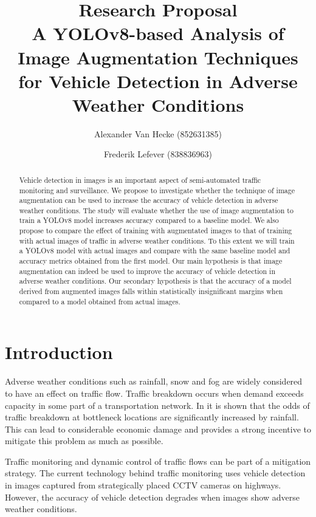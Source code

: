 \documentclass[]{article}
\title{Research Proposal \\
	A YOLOv8-based Analysis of Image Augmentation Techniques for Vehicle Detection in Adverse Weather Conditions}
\author{
		Alexander Van Hecke \small(852631385) \and 
		Frederik Lefever    \small(838836963)}
\begin{document}
\maketitle

\begin{abstract}
	Vehicle detection in images is an important aspect of semi-automated traffic monitoring and surveillance.  We propose to investigate whether the technique of image augmentation can be used to increase the accuracy of vehicle detection in adverse weather conditions.  The study will evaluate whether the use of image augmentation to train a YOLO\small{v8} model increases accuracy compared to a baseline model.  We also propose to compare the effect of training with augmentated images to that of training with actual images of traffic in adverse weather conditions. To this extent we will train a YOLO\small{v8} model with actual images and compare with the same baseline model and accuracy metrics obtained from the first model. Our main hypothesis is that image augmentation can indeed be used to improve the accuracy of vehicle detection in adverse weather conditions. Our secondary hypothesis is that the accuracy of a model derived from augmented images falls within statistically insignificant margins when compared to a model obtained from actual images.  
\end{abstract}

\section{Introduction}

	Adverse weather conditions such as rainfall, snow and fog are widely considered to have an effect on traffic flow. Traffic breakdown occurs when demand exceeds capacity in some part of a transportation network. In \cite{stralenInfluenceAdverseWeather2015} it is shown that the odds of traffic breakdown at bottleneck locations are significantly increased by rainfall.  This can lead to considerable economic damage and provides a strong incentive to mitigate this problem as much as possible.
	
	Traffic monitoring and dynamic control of traffic flows can be part of a mitigation strategy. The current technology behind traffic monitoring uses vehicle detection in images captured from strategically placed CCTV cameras on highways. However, the accuracy of vehicle detection degrades when images show adverse weather conditions.
	
\end{document}
